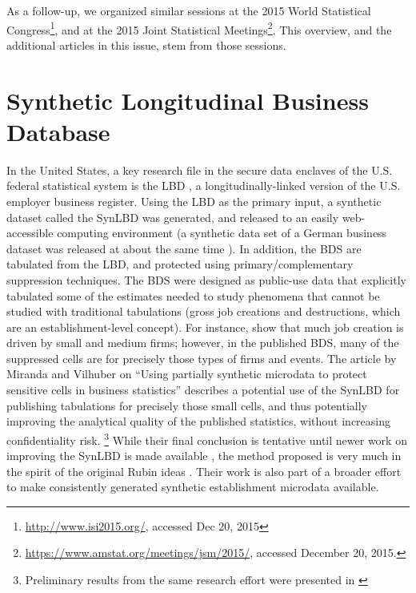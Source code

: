 \documentclass[article,letter]{llncs}
\begin{document}
As a follow-up, we organized similar sessions at the 2015 World Statistical Congress\footnote{\url{http://www.isi2015.org/}, accessed Dec 20, 2015}, and at the 2015 Joint Statistical Meetings\footnote{\url{https://www.amstat.org/meetings/jsm/2015/}, accessed December 20, 2015.}. This overview, and the additional articles in this issue, stem from those sessions. 
 

\section{Synthetic Longitudinal Business Database}
In the United States, a key research file in the secure data enclaves of the U.S. federal statistical system is the  \ac{LBD} \cite{MirandaJarmin2002,LBD2012}, a longitudinally-linked version of the U.S. employer business register. Using the LBD as the primary input, a synthetic dataset called the \ac{SynLBD} \cite{KinneyEtAl2011} was generated, and  released to an easily web-accessible computing environment \cite{AbowdVilhuber2010} (a synthetic data set of a German business dataset was released at about the same time \cite{RePEc:iab:iabfme:201101_de}). 
In addition, the \ac{BDS} are tabulated from the \ac{LBD}, and protected using primary/complementary suppression techniques. The \ac{BDS} were designed as public-use data that explicitly tabulated some of the estimates needed to study phenomena that cannot be studied with traditional tabulations (gross job creations and destructions, which are an establishment-level concept). For instance, \cite{RePEc:nbr:nberwo:16300}  show that much job creation is driven by small and medium firms; however, in the published \ac{BDS}, many of the suppressed cells are for precisely those types of firms and events.
The article by Miranda and Vilhuber on ``Using partially synthetic microdata to protect
sensitive cells in business statistics'' describes a potential use of the SynLBD for publishing tabulations for precisely those small cells, and thus potentially improving the analytical quality of the published statistics, without increasing confidentiality risk.%
\footnote{Preliminary results from the same research effort were presented in \cite{psd2014a}}
While their final conclusion is tentative until newer work on improving the SynLBD is made available \cite{SJIAOS-2014d}, the method proposed is very much in the spirit of the original Rubin ideas \cite{rubin93}. Their work is also part of a broader effort to make consistently generated synthetic establishment microdata available.
\end{document}
